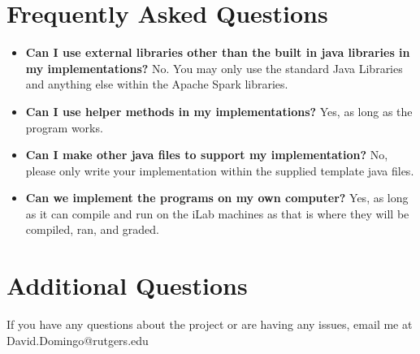 \documentclass{article}
\begin{document}
\section*{Frequently Asked Questions}
\begin{itemize}
\item \textbf{Can I use external libraries other than the built in java libraries in my implementations?} No. You may only use the standard Java Libraries and anything else within the Apache Spark libraries.
\item \textbf{Can I use helper methods in my implementations?} Yes, as long as the program works. 
\item \textbf{Can I make other java files to support my implementation?} No, please only write your implementation within the supplied template java files.
\item \textbf{Can we implement the programs on my own computer?} Yes, as long as it can compile and run on the iLab machines as that is where they will be compiled, ran, and graded. 
\end{itemize}


\section*{Additional Questions} %
If you have any questions about the project or are having any issues, email me at David.Domingo@rutgers.edu
\end{document}
